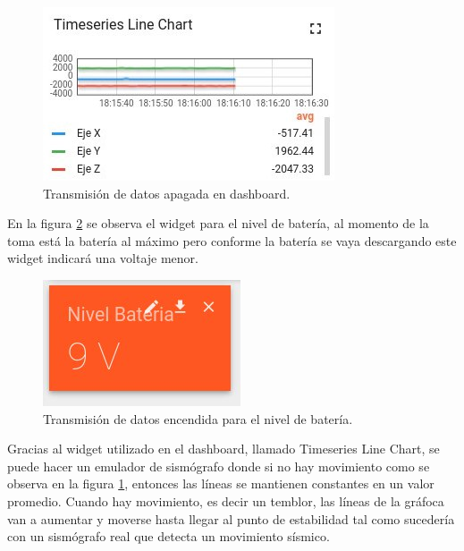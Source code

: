 \begin{figure}[H]
        \centering
        \includegraphics[width=0.5\linewidth]{fotos/apagado.jpg}
        \caption{Transmisión de datos apagada en dashboard.}
        \label{apagado}
    \end{figure}

En la figura \ref{apagado2} se observa el widget para el nivel de batería, al momento de la toma está la batería al máximo pero conforme la batería se vaya descargando este widget indicará una voltaje menor. 

    \begin{figure}[H]
        \centering
        \includegraphics[width=0.4\linewidth]{fotos/nueve.jpg}
        \caption{Transmisión de datos encendida para el nivel de batería.}
        \label{apagado2}
    \end{figure}


Gracias al widget utilizado en el dashboard, llamado Timeseries Line Chart, se puede hacer un emulador de sismógrafo donde si no hay movimiento como se observa en la figura \ref{apagado}, entonces las líneas se mantienen constantes en un valor promedio. Cuando hay movimiento, es decir un temblor, las líneas de la gráfoca van a aumentar y moverse hasta llegar al punto de estabilidad tal como sucedería con un sismógrafo real que detecta un movimiento sísmico. 
